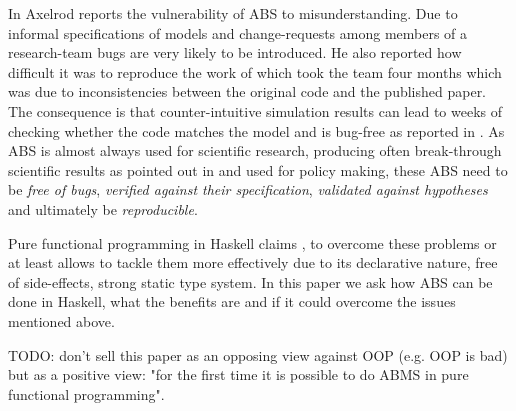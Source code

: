 In \cite{axelrod_chapter_2006} Axelrod reports the vulnerability of ABS to misunderstanding. Due to informal specifications of models and change-requests among members of a research-team bugs are very likely to be introduced. He also reported how difficult it was to reproduce the work of \cite{axelrod_convergence_1995} which took the team four months which was due to inconsistencies between the original code and the published paper. The consequence is that counter-intuitive simulation results can lead to weeks of checking whether the code matches the model and is bug-free as reported in \cite{axelrod_advancing_1997}. As ABS is almost always used for scientific research, producing often break-through scientific results as pointed out in \cite{axelrod_chapter_2006} and used for policy making, these ABS need to be \textit{free of bugs}, \textit{verified against their specification}, \textit{validated against hypotheses} and ultimately be \textit{reproducible}.

Pure functional programming in Haskell claims \cite{hudak_history_2007}, \cite{hudak_haskell_1994} to overcome these problems or at least allows to tackle them more effectively due to its declarative nature, free of side-effects, strong static type system. In this paper we ask how ABS can be done in Haskell, what the benefits are and if it could overcome the issues mentioned above.

TODO: don't sell this paper as an opposing view against OOP (e.g. OOP is bad) but as a positive view: "for the first time it is possible to do ABMS in pure functional programming".

